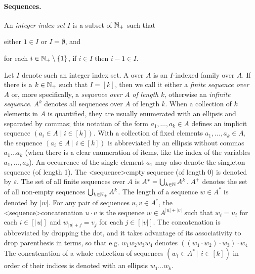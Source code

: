 \documentclass[../document.tex]{subfiles}
\begin{document}
    \paragraph{Sequences.}
    An \emph{integer index set} \(I\) is a subset of \(\mathbb{N}_+\) such that
    \begin{inparaenum}[]
        \item either \(1 \in I\) or \(I = \emptyset\), and
        \item for each \(i \in \mathbb{N}_+ \setminus \{1\}\), if \(i \in I\) then \(i-1 \in I\).
    \end{inparaenum}
    Let \(I\) denote such an integer index set.
    A  over \(A\) is an \(I\)-indexed family over \(A\).
    If there is a \(k\in \mathbb{N}_+\) such that \(I = [k]\), then we call it either a \emph{finite sequence over \(A\)} or, more specifically, a \emph{sequence over \(A\) of length \(k\)}, otherwise an \emph{infinite sequence}.
    \(A^k\) denotes all sequences over \(A\) of length \(k\).
    When a collection of \(k\) elements in \(A\) is quantified, they are usually enumerated with an ellipsis and separated by commas; this notation of the form \(a_1, \ldots, a_k \in A\) defines an implicit sequence \((a_i \in A \mid i \in [k])\).
    With a collection of fixed elements \(a_1, \ldots, a_k \in A\), the sequence \((a_i \in A \mid i \in [k])\) is abbreviated by an ellipsis without commas \(a_1 \ldots a_k\) (when there is a clear enumeration of items, like the index of the variables \(a_1, \ldots, a_k\)).
    An occurrence of the single element \(a_1\) may also denote the singleton sequence (of length 1).
    The <sequence>{empty sequence} (of length 0) is denoted by \(\varepsilon\).
    The set of all finite sequences over \(A\) is \(A^* = \bigcup_{k \in \mathbb{N}} A^k\).
    \(A^+\) denotes the set of all non-empty sequences \(\bigcup_{k \in \mathbb{N}_+} A^k\).
    The length of a sequence \(w \in A^*\) is denoted by \(|w|\).
    For any pair of sequences \(u,v \in A^*\), the <sequence>{concatenation} \(u \cdot v\) is the sequence \(w\in A^{|u|+|v|}\) such that \(w_i=u_i\) for each \(i \in [|u|]\) and \(w_{|u|+j} = v_j\) for each \(j \in [|v|]\).
    The concatenation is abbreviated by dropping the dot, and it takes advantage of its associativity to drop parenthesis in terms, so that e.g. \(w_1 w_2 w_3 w_4\) denotes \(((w_1 \cdot w_2) \cdot w_3) \cdot w_4\)
    The concatenation of a whole collection of sequences \((w_i \in A^* \mid i \in [k])\) in order of their indices is denoted with an ellipsis \(w_1 \ldots w_k\).
\end{document}
